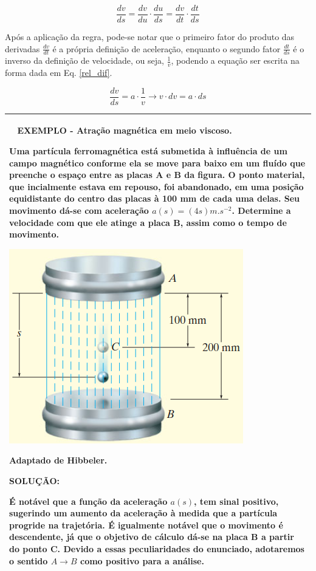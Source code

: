 \documentclass[a4paper, 11pt]{report}
\newenvironment{myboxed}
    {
        \begin{center}
        \begin{tabular}{p{0.7\textwidth}}
        \hline\
    }
    { 
        \\\hline
        \end{tabular} 
        \end{center}
    }
\begin{document}
$$
\frac{dv}{ds} = \frac{dv}{du} \cdot \frac{du}{ds} = \frac{dv}{dt} \cdot \frac{dt}{ds}
$$

Após a aplicação da regra, pode-se notar que o primeiro fator do produto das 
derivadas $\frac{dv}{dt}$ é a própria definição de aceleração, enquanto o 
segundo fator $\frac{dt}{ds}$ é o inverso da definição de velocidade, ou seja, 
$\frac{1}{v}$, podendo a equação ser escrita na forma dada em Eq. \ref{rel_dif}.

\begin{equation}
    \frac{dv}{ds} = a \cdot \frac{1}{v} \rightarrow v \cdot dv = a \cdot ds
    \label{rel_dif}
\end{equation}

\begin{myboxed}
    \textbf{EXEMPLO - Atração magnética em meio viscoso.}

    Uma partícula ferromagnética está submetida à influência de um campo magnético
    conforme ela se move para baixo em um fluído que preenche o espaço entre 
    as placas A e B da figura. O ponto material, que incialmente estava em repouso, 
    foi abandonado, em uma posição equidistante do centro das placas à 100 mm de 
    cada uma delas. Seu movimento dá-se com aceleração $a(s) = (4s) m.s^{-2}$. 
    Determine a velocidade com que ele atinge a placa B, assim como o tempo de 
    movimento. 

    \begin{staticfigure}
        \centering
        \includegraphics[scale=0.4]{img/hibbelerexerc.png}
        \caption{Adaptado de Hibbeler.}
    \end{staticfigure}

    \textbf{SOLUÇÃO:}

    É notável que a função da aceleração $a(s)$, tem sinal positivo, sugerindo 
    um aumento da aceleração à medida que a partícula progride na trajetória. 
    É igualmente notável que o movimento é descendente, já que o objetivo de
    cálculo dá-se na placa B a partir do ponto C. Devido a essas peculiaridades 
    do enunciado, adotaremos o sentido $A \rightarrow B$ como positivo para a 
    análise. 


\end{myboxed}
\end{document}
